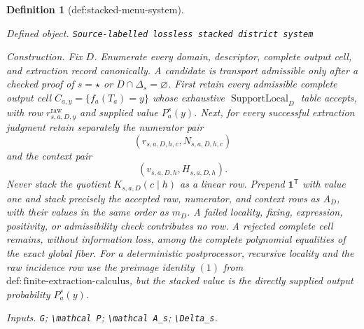 \documentclass{article}
\newtheorem{definition}{Definition}
\begin{document}
\begin{definition}[def:stacked-menu-system]\label{def:stacked-menu-system}
\par\smallskip\noindent\emph{Defined object.} \texttt{Source-\allowbreak{}labelled lossless stacked district system}
\par\smallskip\noindent\emph{Construction.} Fix \(D\).  Enumerate every domain, descriptor, complete output cell, and extraction record canonically.  A candidate is transport admissible only after a checked proof of \(s=\star\) or \(D\cap\Delta_s=\varnothing\).  First retain every admissible complete output cell \(C_{a,y}=\{f_a(T_a)=y\}\) whose exhaustive \(\operatorname{SupportLocal}_D\) table accepts, with row \(r^{\mathrm{raw}}_{s,a,D,y}\) and supplied value \(P_a^s(y)\).  Next, for every successful extraction judgment retain separately the numerator pair
\[
(r_{s,a,D,h,c},N_{s,a,D,h,c})
\]
and the context pair
\[
(v_{s,a,D,h},H_{s,a,D,h}).
\]
Never stack the quotient \(K_{s,a,D}(c\mid h)\) as a linear row.  Prepend \(\mathbf 1^{\mathsf T}\) with value one and stack precisely the accepted raw, numerator, and context rows as \(A_D\), with their values in the same order as \(m_D\).  A failed locality, fixing, expression, positivity, or admissibility check contributes no row.  A rejected complete cell remains, without information loss, among the complete polynomial equalities of the exact global fiber.  For a deterministic postprocessor, recursive locality and the raw incidence row use the preimage identity \((1)\) from \(\mathrm{def:finite\text{-}extraction\text{-}calculus}\), but the stacked value is the directly supplied output probability \(P_a^s(y)\).
\par\smallskip\noindent\emph{Inputs.} \texttt{G}; \texttt{\textbackslash{}\allowbreak{}mathcal P}; \texttt{\textbackslash{}\allowbreak{}mathcal A\_\allowbreak{}s}; \texttt{\textbackslash{}\allowbreak{}Delta\_\allowbreak{}s}.
\end{definition}
\end{document}

